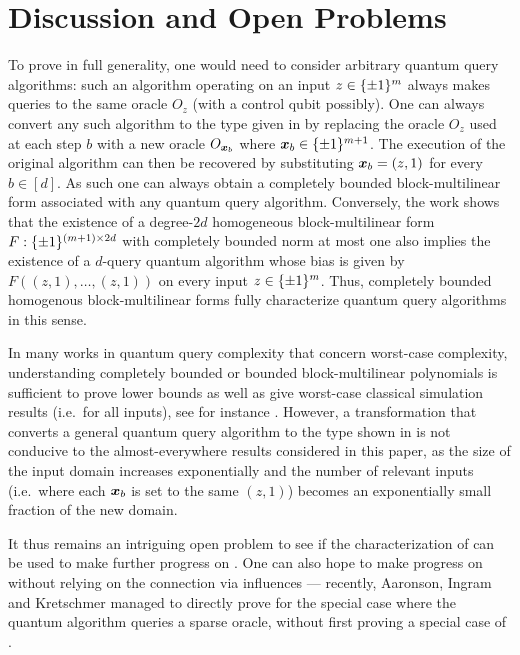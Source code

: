 \section{Discussion and Open Problems} 
\label{sec:open}

To prove  in full generality, one would need to consider arbitrary quantum query algorithms: such an algorithm operating on an input $z \in \{\pm 1\}^m$ always makes queries to the same oracle $O_z$ (with a control qubit possibly). One can always convert any such algorithm to the type given in  by replacing the oracle $O_z$ used at each step $b$ with a new oracle $O_{\boldsymbol{x}_b}$ where $\boldsymbol{x}_b \in \{\pm 1\}^{m+1}$. The execution of the original algorithm can then be recovered by substituting $\boldsymbol{x}_b = (z,1)$ for every $b \in [d]$.
As such one can always obtain a completely bounded block-multilinear form associated with any quantum query algorithm. Conversely, the work \cite{ABP18} shows that the existence of a degree-$2d$ homogeneous block-multilinear form $F : \{\pm 1\}^{(m+1) \times 2d}$   with completely bounded norm at most one also implies the existence of a $d$-query quantum algorithm whose bias is given by $F((z,1), \ldots, (z,1))$ on every input $z \in \{\pm 1\}^m$. Thus, completely bounded homogenous block-multilinear forms fully characterize quantum query algorithms in this sense. 



In many works in quantum query complexity that concern worst-case complexity, understanding completely bounded or bounded block-multilinear polynomials is sufficient to prove lower bounds as well as give worst-case classical simulation results (i.e.\ for all inputs), see for instance \cite{AA:forrelation, BGGS21}. However, a transformation that converts a general quantum query algorithm to the type shown in  is not conducive to the almost-everywhere results considered in this paper, as the size of the input domain increases exponentially and the number of relevant inputs (i.e.\ where each $\boldsymbol{x}_b$ is set to the same $(z,1)$) becomes an exponentially small fraction of the new domain. 

It thus remains an intriguing open problem to see if the characterization of \cite{ABP18} can be used to make further progress on . One can also hope to make progress on  without relying on the connection via influences ---  recently, Aaronson, Ingram and Kretschmer \cite{AIK21} managed to directly prove  for the special case where the quantum algorithm queries a sparse oracle, without first proving a special case of .



